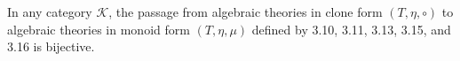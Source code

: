 In any category $\mathcal{K}$, the passage from algebraic theories in clone form $(T, \eta, \circ)$ to algebraic theories in monoid form $(T, \eta, \mu)$ defined by 3.10, 3.11, 3.13, 3.15, and 3.16 is bijective.
